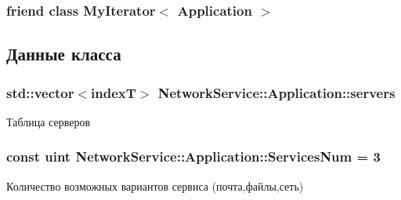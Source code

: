 \subsubsection[{My\+Iterator$<$ Application $>$}]{\setlength{\rightskip}{0pt plus 5cm}friend class {\bf My\+Iterator}$<$ {\bf Application} $>$\hspace{0.3cm}{\ttfamily [friend]}}\label{class_network_service_1_1_application_ad14d365afc30a96b618aab998f4572e5}


\subsection{Данные класса}
\hypertarget{class_network_service_1_1_application_af499fff927e0ee95480eeac2f4bb464b}{}
\subsubsection[{servers}]{\setlength{\rightskip}{0pt plus 5cm}std\+::vector$<${\bf index\+T}$>$ Network\+Service\+::\+Application\+::servers\hspace{0.3cm}{\ttfamily [private]}}\label{class_network_service_1_1_application_af499fff927e0ee95480eeac2f4bb464b}


Таблица серверов 

\hypertarget{class_network_service_1_1_application_a95664d256ae9f339502b82b462d46365}{}
\subsubsection[{Services\+Num}]{\setlength{\rightskip}{0pt plus 5cm}const uint Network\+Service\+::\+Application\+::\+Services\+Num = 3}\label{class_network_service_1_1_application_a95664d256ae9f339502b82b462d46365}


Количество возможных вариантов сервиса (почта,файлы,сеть) 

\hypertarget{class_network_service_1_1_application_a9709635bcf03ef131a655ca1c58efa6b}{}
